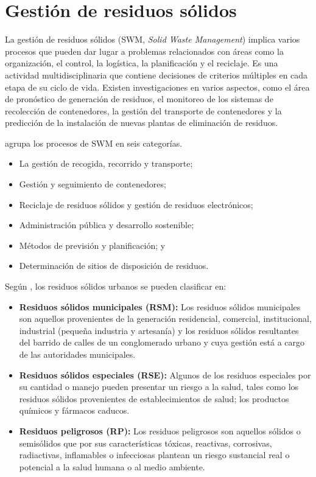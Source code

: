 \chapter{Gestión de residuos sólidos}
\label{chap2}
\ifpdf
  \graphicspath{{Chapter2/Chapter2Figs/}}
\else
  \graphicspath{{Chapter2/Chapter2Figs/}}\fi


La gestión de residuos sólidos (SWM, \textit{Solid Waste Management}) implica varios procesos que pueden dar lugar a problemas relacionados con áreas como la organización, el control, la logística, la planificación y el reciclaje. Es una actividad multidisciplinaria que contiene decisiones de criterios múltiples en cada etapa de su ciclo de vida. Existen investigaciones en varios aspectos, como el área de pronóstico de generación de residuos, el monitoreo de los sistemas de recolección de contenedores, la gestión del transporte de contenedores y la predicción de la instalación de nuevas plantas de eliminación de residuos. \citep{VitorinodeSouzaMelare2017TechnologiesReview}

\citet{VitorinodeSouzaMelare2017TechnologiesReview} agrupa los procesos de SWM en seis categorías. 
\begin{itemize}
\item La gestión de recogida, recorrido y transporte; 
\item Gestión y seguimiento de contenedores; 
\item Reciclaje de residuos sólidos y gestión de residuos electrónicos; 
\item Administración pública y desarrollo sostenible; 
\item Métodos de previsión y planificación; y 
\item Determinación de sitios de disposición de residuos.
\end{itemize}


Según \citet{Acurio1997DiagnosticoCaribe}, los residuos sólidos urbanos se pueden clasificar en:
\begin{itemize}
\item \textbf{Residuos sólidos municipales (RSM):} Los residuos sólidos municipales son aquellos provenientes de la generación residencial, comercial, institucional, industrial (pequeña industria y artesanía) y los residuos sólidos resultantes del barrido de calles de un conglomerado urbano y cuya gestión está a cargo de las autoridades municipales.
\item \textbf{Residuos sólidos especiales (RSE):} Algunos de los residuos especiales por su cantidad o manejo pueden presentar un riesgo a la salud, tales como los residuos sólidos provenientes de establecimientos de salud; los productos químicos y fármacos caducos.
\item \textbf{Residuos peligrosos (RP):} Los residuos peligrosos son aquellos sólidos o semisólidos que por sus características tóxicas, reactivas, corrosivas, radiactivas, inflamables o infecciosas plantean un riesgo sustancial real o potencial a la salud humana o al medio ambiente.
\end{itemize}

